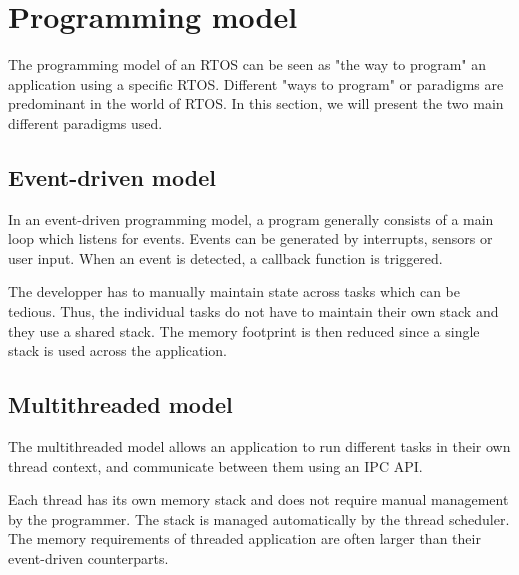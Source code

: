 \section{Programming model}
The programming model of an RTOS can be seen as "the way to program" an application using a specific RTOS.
Different "ways to program" or paradigms are predominant in the world of RTOS.
In this section, we will present the two main different paradigms used\cite{comparison_iot_constrained_devices}.


\subsection{Event-driven model}
In an event-driven programming model, a program generally consists of a main loop which listens for events.
Events can be generated by interrupts, sensors or user input.
When an event is detected, a callback function is triggered.

The developper has to manually maintain state across tasks which can be tedious.
Thus, the individual tasks do not have to maintain their own stack and they use a shared stack.
The memory footprint is then reduced since a single stack is used across the application.

\subsection{Multithreaded model}
The multithreaded model allows an application to run different tasks in their own thread context,
    and communicate between them using an IPC API.

Each thread has its own memory stack and does not require manual management by the programmer.
The stack is managed automatically by the thread scheduler.
The memory requirements of threaded application are often larger than their event-driven counterparts.